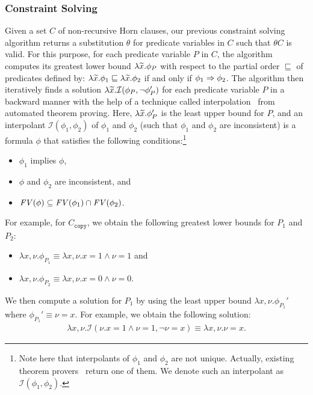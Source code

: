 \subsubsection{Constraint Solving}
\label{sec:cs}

Given a set \(C\) of non-recursive Horn clauses, our previous constraint 
solving algorithm returns a substitution \(\theta\) for predicate 
variables in \(C\) such that \(\theta C\) is valid.  For this purpose, 
for each predicate variable \(P\) in \(C\), the algorithm computes its 
greatest lower bound \(\lambda \widetilde{x}.\phi_{P}\) with respect to the 
partial order \(\sqsubseteq\) of predicates defined by: \(\lambda 
\widetilde{x}.\phi_1 \sqsubseteq \lambda \widetilde{x}.\phi_2\) if and only if 
\(\phi_1 \Rightarrow \phi_2\).  The algorithm then iteratively finds a 
solution \(\lambda \widetilde{x}.\mathcal{I}(\phi_P,\neg \phi_P')\) for each 
predicate variable \(P\) in a backward manner with the help of a 
technique called interpolation~\cite{Henzinger2004,McMillan2005} from 
automated theorem proving.  Here, \(\lambda \widetilde{x}.\phi_{P}'\) is the 
least upper bound  for \(P\), and an interpolant 
\(\mathcal{I}(\phi_1,\phi_2)\) of \(\phi_1\) and \(\phi_2\) (such that 
\(\phi_1\) and \(\phi_2\) are inconsistent) is a formula \(\phi\) that 
satisfies the following conditions:\footnote{Note here that interpolants 
of \(\phi_1\) and \(\phi_2\) are not unique.  Actually, existing theorem 
provers~\cite{Henzinger2004,McMillan2005,Beyer2008} return one of them. 
We denote such an interpolant as \(\mathcal{I}(\phi_1,\phi_2)\).}
\begin{itemize}
\item \(\phi_1\) implies \(\phi\),
\item \(\phi\) and \(\phi_2\) are inconsistent, and
\item \(\mathit{FV}({\phi}) \subseteq \mathit{FV}({\phi_1}) \cap \mathit{FV}({\phi_2})\).
\end{itemize}
For example, for \(C_{\texttt{copy}}\), we obtain the following greatest 
lower bounds for \(P_1\) and \(P_2\):
\begin{itemize}
\item \(\lambda x,\nu.\phi_{P_1}\equiv \lambda x,\nu.x=1 \land \nu=1\) and
\item \(\lambda x,\nu.\phi_{P_2}\equiv \lambda x,\nu.x=0 \land \nu=0\).
\end{itemize}
We then compute a solution for \(P_1\) by using the least upper bound 
\(\lambda x,\nu.\phi_{P_1}'\) where \(\phi_{P_1}' \equiv \nu=x\).  For 
example, we obtain the following solution:
\begin{eqnarray*}
\lambda x,\nu.\mathcal{I}(\nu.x=1 \land \nu=1,\neg \nu=x) \equiv \lambda x,\nu.\nu=x.
\end{eqnarray*}
